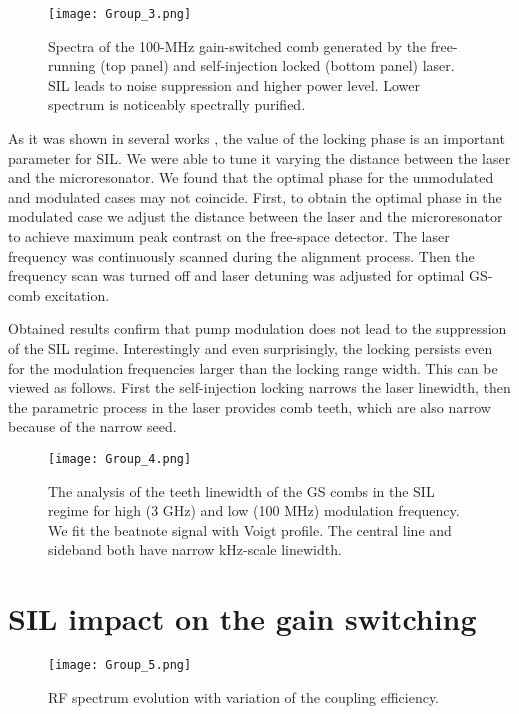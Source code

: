 \documentclass[a4paper, amsfonts, amssymb, amsmath, reprint, showkeys, nofootinbib, twoside,longbibliography, aps]{revtex4-1}
\begin{document}
\begin{figure}[hbtp!]
\centering
\texttt{[image: Group\_3.png]}
\caption{Spectra of the 100-MHz gain-switched comb generated by the free-running (top panel) and self-injection locked (bottom panel) laser. SIL leads to noise suppression and higher power level. Lower spectrum is noticeably spectrally purified.  
}
\label{fig:OnOff}
\end{figure}


As it was shown in several works \cite{Kondratiev:17, Galiev20}, the value of the locking phase is an important parameter for SIL. We were able to tune it varying the distance between the laser and the microresonator. We found that the optimal phase for the unmodulated and modulated cases may not coincide. First, to obtain the optimal phase in the modulated case we adjust the distance between the laser and the microresonator to achieve maximum peak contrast on the free-space detector. The laser frequency was continuously scanned during the alignment process. Then the frequency scan was turned off and laser detuning was adjusted for optimal GS-comb excitation. 

Obtained results confirm that pump modulation does not lead to the suppression of the SIL regime. Interestingly and even surprisingly, the locking persists even for the modulation frequencies larger than the locking range width. This can be viewed as follows. First the self-injection locking narrows the laser linewidth, then the parametric process in the laser provides comb teeth, which are also narrow because of the narrow seed.



\begin{figure*}[htbp!]
\centering
\texttt{[image: Group\_4.png]}
\caption{The analysis of the teeth linewidth of the GS combs in the SIL regime for  high (3 GHz) and low (100 MHz) modulation frequency. We fit the beatnote signal with Voigt profile. The central line and sideband both have narrow kHz-scale linewidth. }
\label{fig:Ultimate2}
\end{figure*}


\section{SIL impact on the gain switching}



\begin{figure}[hbtp!]
\centering
\texttt{[image: Group\_5.png]}
\caption{  RF spectrum evolution with variation of the coupling efficiency.  }
\label{fig:Coupl}
\end{figure}
\end{document}
